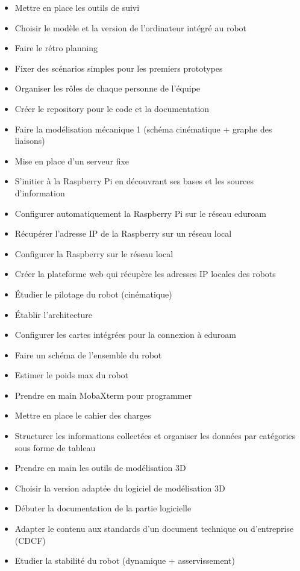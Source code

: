 \documentclass[a4paper,12pt]{report}  %
\begin{document}
\begin{itemize}
	\item Mettre en place les outils de suivi
	\item Choisir le modèle et la version de l'ordinateur intégré au robot
	\item Faire le rétro planning
	\item Fixer des scénarios simples pour les premiers prototypes
	\item Organiser les rôles de chaque personne de l'équipe
	\item Créer le repository pour le code et la documentation
	\item Faire la modélisation mécanique 1 (schéma cinématique + graphe des liaisons)
	\item Mise en place d'un serveur fixe 
	\item S’initier à la Raspberry Pi en découvrant ses bases et les sources d'information
	\item Configurer automatiquement la Raspberry Pi sur le réseau eduroam 
	\item Récupérer l'adresse IP de la Raspberry sur un réseau local
	\item Configurer la Raspberry sur le réseau local
	\item Créer la plateforme web qui récupère les adresses IP locales des robots
	\item Étudier le pilotage du robot (cinématique)
	\item Établir l'architecture
	\item Configurer les cartes intégrées pour la connexion à eduroam 
	\item Faire un schéma de l'ensemble du robot 
	\item Estimer le poids max du robot 
	\item Prendre en main MobaXterm pour programmer
	\item Mettre en place le cahier des charges
	\item Structurer les informations collectées et organiser les données par catégories sous forme de tableau
	\item Prendre en main les outils de modélisation 3D
	\item Choisir la version adaptée du logiciel de modélisation 3D
	\item Débuter la documentation de la partie logicielle
	\item Adapter le contenu aux standards d’un document technique ou d’entreprise (CDCF)
	\item Etudier la stabilité du robot (dynamique + asservissement)

\end{itemize}
\end{document}
